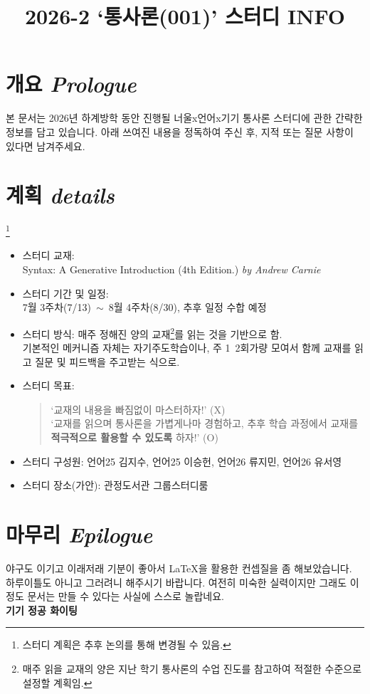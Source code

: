 \documentclass[a4paper, 9pt]{article}
\begin{document}
\title{2026-2 `통사론(001)' 스터디 INFO}
\maketitle

\section{개요 \emph{Prologue}}
본 문서는 2026년 하계방학 동안 진행될 너울x언어x기기 통사론 스터디에 관한 간략한 정보를 담고 있습니다. 아래 쓰여진 내용을 정독하여 주신 후, 지적 또는 질문 사항이 있다면 남겨주세요.  

\section{계획 \emph{details}}\footnote{스터디 계획은 추후 논의를 통해 변경될 수 있음.}
\begin{itemize}
\item 스터디 교재: \\ 
Syntax: A Generative Introduction (4th Edition.) \textit{by Andrew Carnie}
\item 스터디 기간 및 일정: \\
7월 3주차(7/13)~$\sim$~8월 4주차(8/30), 추후 일정 수합 예정
\item 스터디 방식: 매주 정해진 양의 교재\footnote{매주 읽을 교재의 양은 지난 학기 통사론의 수업 진도를 참고하여 적절한 수준으로 설정할 계획임.}를 읽는 것을 기반으로 함. \\ 
기본적인 메커니즘 자체는 자기주도학습이나, 주 1~2회가량 모여서 함께 교재를 읽고 질문 및 피드백을 주고받는 식으로.
\item 스터디 목표: 
\begin{quote}
    `교재의 내용을 빠짐없이 마스터하자!' (X) \\
    `교재를 읽으며 통사론을 가볍게나마 경험하고, 추후 학습 과정에서 교재를 \textbf{적극적으로 활용할 수 있도록} 하자!' (O)
\end{quote}
\item 스터디 구성원: 언어25 김지수, 언어25 이승헌, 언어26 류지민, 언어26 유서영
\item 스터디 장소(가안): 관정도서관 그룹스터디룸 
\end{itemize}

\section{마무리 \emph{Epilogue}}
야구도 이기고 이래저래 기분이 좋아서 \LaTeX 을 활용한 컨셉질을 좀 해보았습니다. 
하루이틀도 아니고 그러려니 해주시기 바랍니다. 
여전히 미숙한 실력이지만 그래도 이정도 문서는 만들 수 있다는 사실에 스스로 놀랍네요. \\
\textbf{기기 정공 화이팅~} 
\end{document}
